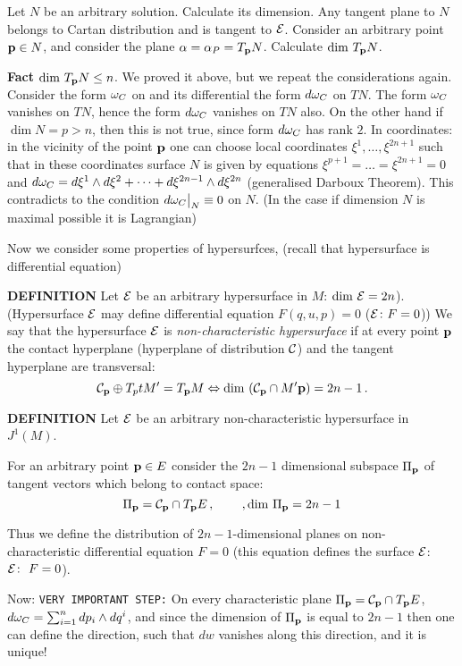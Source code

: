 Let  $N$ be an arbitrary solution.   Calculate its dimension.
Any tangent plane to $N$  belongs to Cartan distribution
and is tangent to ${\cal E}$.   Consider an arbitrary
point ${\bf p} \in N$, and consider the plane
$\alpha=\alpha_P= T_{\bf p} N$. Calculate ${\rm dim\,\,} T_{\bf p} N$.

{\bf Fact}   ${\rm dim\,\,} T_{\bf p} N\leq n$.  We proved it above, but
we repeat the considerations again.   Consider the form ${\omega}_C$
on and its differential the form $d{\omega}_C$ on $TN$.
The form ${\omega}_C$ vanishes on $TN$, hence the form $d{\omega}_C$
vanishes on $TN$ also.  On the other hand if $\dim N=p>n$,
then  this is not true, since form $d{\omega}_C$ has rank $2$.
In coordinates:  in the vicinity of the point
${\bf p}$  one can choose local  coordinates
$\xi^1,\dots,\xi^{2n+1}$ such that 
in these coordinates
surface $N$  is given by equations 
$\xi^{p+1}=\dots=\xi^{2n+1}=0$ and
$d{\omega}_C=d\xi^1\wedge d\xi^2+\dots +
d\xi^{2n-1}\wedge d\xi^{2n}$ 
(generalised Darboux Theorem). 
This contradicts to the condition $d{\omega}_C\big\vert_N\equiv 0$
on $N$.
(In the case if dimension $N$  is maximal possible 
it is Lagrangian)           

Now we consider some properties of hypersurfces,
(recall that  hypersurface is differential equation)

{\bf DEFINITION}   Let ${\cal E}$  be an arbitrary hypersurface
  in $M$: ${\rm dim\,\,} {\cal E}=2n$). (Hypersurface  ${\cal E}$
may define  differential equation $F(q,u,p)=0$ (${\cal E}\colon F=0$))  
We say that the hypersurface ${\cal E}$ is 
{\it non-characteristic hypersurface} if at every point ${\bf p}$
the contact hyperplane 
(hyperplane of distribution ${\cal C}$) and the tangent hyperplane
are transversal:
        $$
{\cal C}_{\bf p}\oplus T_pt M'=T_{\bf p} M\Leftrightarrow
    {\rm dim\,\,} ({\cal C}_{\bf p}\cap M'{\bf p})=2n-1\,.
        $$

\medskip

{\bf DEFINITION}   Let   ${\cal E}$ be an 
arbitrary non-characteristic hypersurface in $J^1(M)$.

 For an arbitrary point ${\bf p}\in E$ consider the
$2n-1$ dimensional subspace $\Pi_{\bf p}$ of 
tangent vectors which belong to contact space:
            $$
\Pi_{\bf p}={\cal C}_{\bf p}\cap T_{\bf p} E\,,\qquad \,,{\rm dim\,\,} \Pi_{\bf p}=2n-1
            $$
 
\medskip

  Thus we define the distribution of $2n-1$-dimensional planes
on non-characteristic differential  equation $F=0$ (this equation
defines the surface ${\cal E}$: ${\cal E}\colon\,\, F=0$).

Now: {\tt VERY IMPORTANT STEP:} 
On every characteristic plane
$\Pi_{\bf p}={\cal C}_{\bf p}\cap T_{\bf p} E$, $d{\omega}_C=
\sum_{i=1}^n dp_i\wedge dq^i$,
and since the dimension of $\Pi_{\bf p}$ is equal to $2n-1$
then one can define the direction, such that $dw$ vanishes
along this direction, and it is unique!


